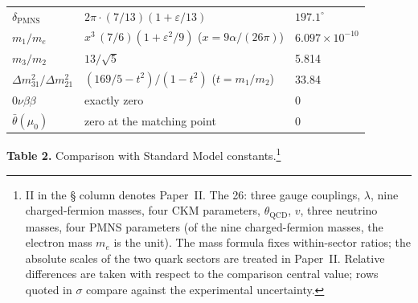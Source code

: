 \documentclass[12pt,a4paper]{article}
\begin{document}
\begin{center}
\begin{tabular}{@{}lll@{}}
$\delta_\mathrm{PMNS}$ & $2\pi\cdot(7/13)(1+\varepsilon/13)$ & $197.1^\circ$ \\
$m_1/m_e$ & $x^3\,(7/6)(1+\varepsilon^2/9)$ ($x = 9\alpha/(26\pi)$) & $6.097 \times 10^{-10}$ \\
$m_3/m_2$ & $13/\sqrt5$ & 5.814 \\
$\Delta m^2_{31}/\Delta m^2_{21}$ & $(169/5-t^2)/(1-t^2)$ ($t = m_1/m_2$) & 33.84 \\
$0\nu\beta\beta$ & exactly zero & 0 \\
$\bar\theta(\mu_0)$ & zero at the matching point & 0 \\
\bottomrule
\end{tabular}
\end{center}

\bigskip\noindent\textbf{Table 2.} Comparison with Standard Model constants.\footnote{II in the \S{} column denotes Paper~II. The 26: three gauge couplings, $\lambda$, nine charged-fermion masses, four CKM parameters, $\theta_\mathrm{QCD}$, $v$, three neutrino masses, four PMNS parameters (of the nine charged-fermion masses, the electron mass $m_e$ is the unit). The mass formula fixes within-sector ratios; the absolute scales of the two quark sectors are treated in Paper~II. Relative differences are taken with respect to the comparison central value; rows quoted in $\sigma$ compare against the experimental uncertainty.}
\nopagebreak[4]
\end{document}
